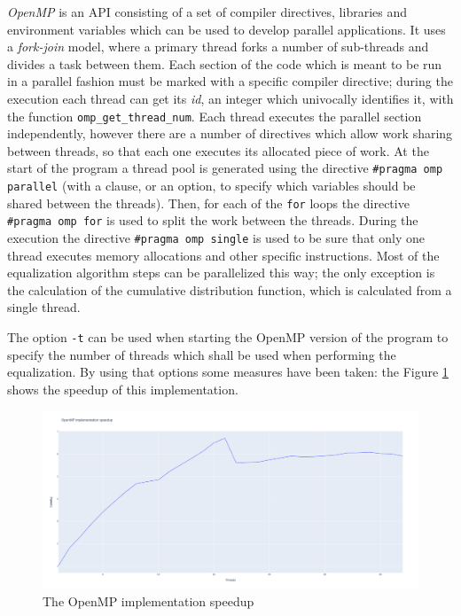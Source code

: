 \documentclass[10pt,twocolumn,letterpaper]{article}
\begin{document}
\emph{OpenMP} is an API consisting of a set of compiler directives, libraries and
environment variables which can be used to develop parallel applications. It uses
a \emph{fork-join} model, where a primary thread forks a number of sub-threads and
divides a task between them. Each section of the code which is meant to be run in
a parallel fashion must be marked with a specific compiler directive; during the
execution each thread can get its \emph{id}, an integer which univocally identifies
it, with the function \verb|omp_get_thread_num|. Each thread executes the parallel
section independently, however there are a number of directives which allow
work sharing between threads, so that each one executes its allocated piece of work.
At the start of the program a thread pool is generated using the directive
\verb|#pragma omp parallel| (with a clause, or an option, to specify which variables
should be shared between the threads). Then, for each of the \verb|for| loops the
directive \verb|#pragma omp for| is used to split the work between the threads.
During the execution the directive \verb|#pragma omp single| is used to be sure that
only one thread executes memory allocations and other specific instructions.
Most of the equalization algorithm steps can be parallelized this way; the only exception
is the calculation of the cumulative distribution function, which is calculated from
a single thread.

The option \verb|-t| can be used when starting the OpenMP version of the program
to specify the number of threads which shall be used when performing the equalization.
By using that options some measures have been taken: the Figure \ref{fig:openmp-speedup}
shows the speedup of this implementation.

\begin{figure}
\begin{center}
\includegraphics[width=1.0\linewidth]{./img/omp-speedup.png}
\end{center}
    \caption{The OpenMP implementation speedup}
\label{fig:openmp-speedup}
\end{figure}
\end{document}
